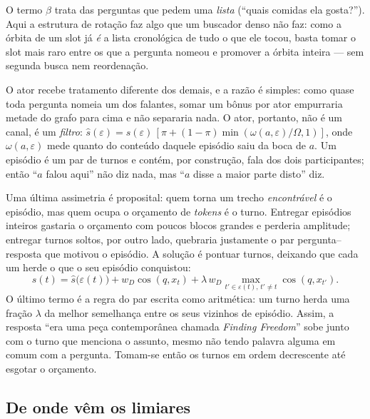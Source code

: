 O termo $\beta$ trata das perguntas que pedem uma \emph{lista} (``quais comidas
ela gosta?''). Aqui a estrutura de rotação faz algo que um buscador denso não faz:
como a órbita de um slot já \emph{é} a lista cronológica de tudo o que ele tocou,
basta tomar o slot mais raro entre os que a pergunta nomeou e promover a órbita
inteira --- sem segunda busca nem reordenação.

O ator recebe tratamento diferente dos demais, e a razão é simples: como quase toda
pergunta nomeia um dos falantes, somar um bônus por ator empurraria metade do grafo
para cima e não separaria nada. O ator, portanto, não é um canal, é um
\emph{filtro}: $\hat{s}(\varepsilon)=s(\varepsilon)\,[\pi+(1-\pi)
\min(\omega(a,\varepsilon)/\Omega,1)]$, onde $\omega(a,\varepsilon)$ mede quanto do
conteúdo daquele episódio saiu da boca de $a$. Um episódio é um par de turnos e
contém, por construção, fala dos dois participantes; então ``$a$ falou aqui'' não
diz nada, mas ``$a$ disse a maior parte disto'' diz.

Uma última assimetria é proposital: quem torna um trecho \emph{encontrável} é o
episódio, mas quem ocupa o orçamento de \emph{tokens} é o turno. Entregar episódios inteiros gastaria o
orçamento com poucos blocos grandes e perderia amplitude; entregar turnos soltos,
por outro lado, quebraria justamente o par pergunta--resposta que motivou o
episódio. A solução é pontuar turnos, deixando que cada um herde o que o seu
episódio conquistou:
\begin{equation}
s(t)=\hat{s}\bigl(\varepsilon(t)\bigr)+w_{D}\cos(q,x_t)
+\lambda\,w_{D}\!\!\max_{t'\in\varepsilon(t),\,t'\neq t}\!\!\cos(q,x_{t'}).
\label{eq:turno}
\end{equation}
O último termo é a regra do par escrita como aritmética: um turno herda uma fração
$\lambda$ da melhor semelhança entre os seus vizinhos de episódio. Assim, a
resposta ``era uma peça contemporânea chamada \emph{Finding Freedom}'' sobe junto
com o turno que menciona o assunto, mesmo não tendo palavra alguma em comum com a
pergunta. Tomam-se então os turnos em ordem decrescente até esgotar o orçamento.

\subsection{De onde vêm os limiares}
\label{sec:metodo:calibracao}


